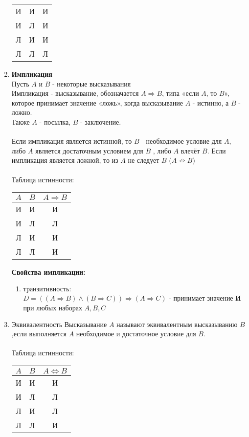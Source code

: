 \documentclass[a4paper, 12pt]{report}
\begin{document}
\begin{enumerate}
\begin{tabular}{|c|c|c|}
		\hline
		И & И & И\\
		И & Л & И\\
		Л & И & И\\
		Л & Л & Л\\
		\hline
	\end{tabular}
	\item \textbf{Импликация}\\
	Пусть $A$ и $B$ - некоторые высказывания\\
	Импликация - высказывание, обозначается $A \Rightarrow B$, типа «если $A$, то $B$», которое принимает значение «ложь», когда высказывание $A$ - истинно, а $B$ - ложно.\\
	
	Также $A$ - посылка, $B$ - заключение.\\\\
	Если импликация является истинной, то $B$ - необходимое условие для $A$, либо $A$ является достаточным условием для $B$ , либо $A$ влечёт $B$.
	Если импликация является ложной, то из $A$ не следует $B$ ($A \nRightarrow B$)\\\\
	Таблица истинности:~~ 
	\begin{tabular}{|c|c|c|}
		\hline
		$A$  & $B$ & $A \Rightarrow B$ \\
		\hline
		И & И & И\\
		И & Л & Л\\
		Л & И & И\\
		Л & Л & И\\
		\hline
	\end{tabular}
	\begin{center}
		\textbf{Свойства импликации:}
	\end{center}
	\begin{enumerate}
		\item транзитивность:\\
		$D = ((A \Rightarrow B) \wedge (B \Rightarrow C)) \Rightarrow (A \Rightarrow C)$ - принимает значение \textbf{И} при любых наборах $A, B, C$
	
		
		
	\end{enumerate}
	\item Эквивалентность
	Высказывание $ A $ называют эквивалентным высказыванию $ B $ ,если выполняется
	 $ A $ необходимое и достаточное условие для $ B $.\\\\
	Таблица истинности:~~ 
\begin{tabular}{|c|c|c|}
	\hline
	$A$  & $B$ & $A \Leftrightarrow B$ \\
	\hline
	И & И & И\\
	И & Л & Л\\
	Л & И & Л\\
	Л & Л & И\\
	\hline
\end{tabular}
	
\end{enumerate}
\end{document}
